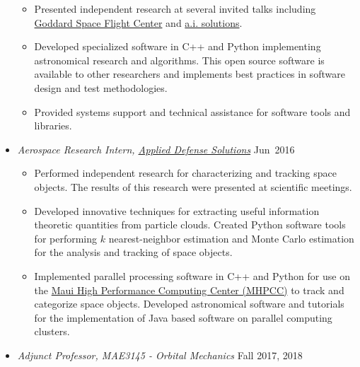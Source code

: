 \begin{itemize}
\begin{itemize}
        \item Presented independent research at several invited talks including \href{https://etd.gsfc.nasa.gov/590/}{Goddard Space Flight Center} and \href{https://ai-solutions.com/}{a.i. solutions}.
        \item Developed specialized software in C++ and Python implementing astronomical research and algorithms.
            This open source software is available to other researchers and implements best practices in software design and test methodologies.
        \item Provided systems support and technical assistance for software tools and libraries.
        \end{itemize}
        \item[] \textit{Aerospace Research Intern, \href{http://www.applieddefense.com/}{Applied Defense Solutions}} \hfill {Jun~2016}
        \begin{itemize}
            \item Performed independent research for characterizing and tracking space objects. 
                The results of this research were presented at scientific meetings.
            \item Developed innovative techniques for extracting useful information theoretic quantities from particle clouds. 
            Created Python software tools for performing \(k\) nearest-neighbor estimation and Monte Carlo estimation for the analysis and tracking of space objects.
            \item Implemented parallel processing software in C++ and Python for use on the \href{https://www.mhpcc.hpc.mil/}{Maui High Performance Computing Center (MHPCC)} to track and categorize space objects.
            Developed astronomical software and tutorials for the implementation of Java based software on parallel computing clusters.
        \end{itemize}
        \item[] \textit{Adjunct Professor, MAE3145 - Orbital Mechanics} \hfill {Fall 2017, 2018}
            \begin{itemize}

\end{itemize}
\end{itemize}
